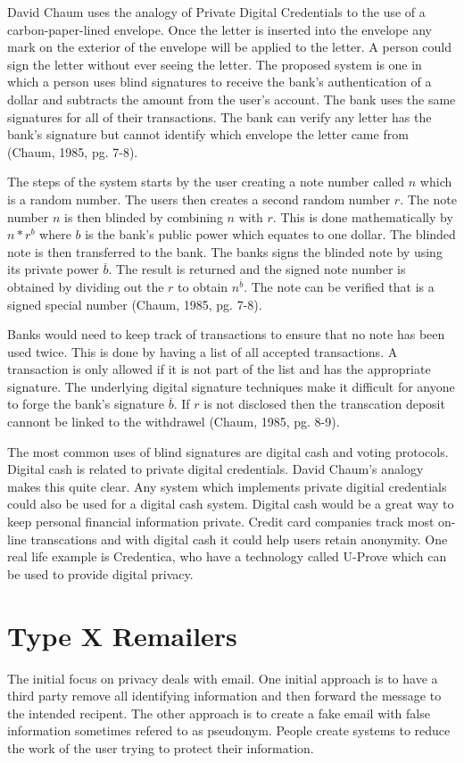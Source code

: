 \documentclass[12pt]{article}
\begin{document}
David Chaum uses the analogy of Private Digital Credentials to the use of a carbon-paper-lined envelope. Once the letter is inserted into the envelope any mark on the exterior of the envelope will be applied to the letter. A person could sign the letter without ever seeing the letter. The proposed system is one in which a person uses blind signatures to receive the bank's authentication of a dollar and subtracts the amount from the user's account. The bank uses the same signatures for all of their transactions. The bank can verify any letter has the bank's signature but cannot identify which envelope the letter came from (Chaum, 1985, pg. 7-8).

The steps of the system starts by the user creating a note number called $n$ which is a random number. The users then creates a second random number $r$. The note number $n$ is then blinded by combining $n$ with $r$. This is done mathematically by $n * r^b$ where $b$ is the bank's public power which equates to one dollar. The blinded note is then transferred to the bank. The banks signs the blinded note by using its private power $\overline{b}$. The result is returned and the signed note number is obtained by dividing out the $r$ to obtain $n^{\overline{b}}$. The note can be verified that is a signed special number (Chaum, 1985, pg. 7-8).

Banks would need to keep track of transactions to ensure that no note has been used twice. This is done by having a list of all accepted transactions. A transaction is only allowed if it is not part of the list and has the appropriate signature. The underlying digital signature techniques make it difficult for anyone to forge the bank's signature $\overline{b}$. If $r$ is not disclosed then the transcation deposit cannont be linked to the withdrawel (Chaum, 1985, pg. 8-9).

The most common uses of blind signatures are digital cash and voting protocols. Digital cash is related to private digital credentials. David Chaum's analogy makes this quite clear. Any system which implements private digitial credentials could also be used for a digital cash system. Digital cash would be a great way to keep personal financial information private. Credit card companies track most on-line transcations and with digital cash it could help users retain anonymity. One real life example is Credentica, who have a technology called U-Prove which can be used to provide digital privacy.

\section{Type X Remailers}\label{sec:type-x}
The initial focus on privacy deals with email. One initial approach is to have a third party remove all identifying information and then forward the message to the intended recipent. The other approach is to create a fake email with false information sometimes refered to as pseudonym. People create systems to reduce the work of the user trying to protect their information.
\end{document}
